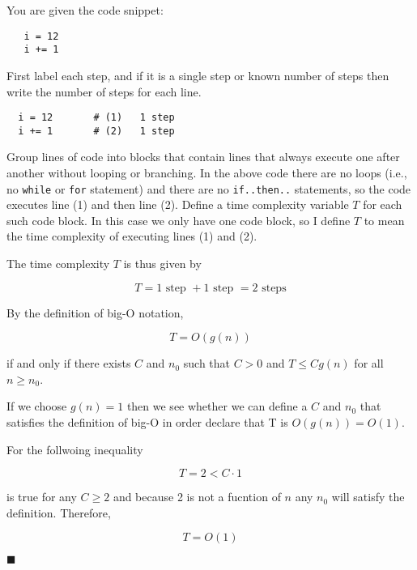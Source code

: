 \documentclass{article}
\begin{document}
You are given the code snippet:

\begin{verbatim}
   i = 12
   i += 1
\end{verbatim}

First label each step, and if it is a single step or known number
of steps then write the number of steps for each line.

\begin{verbatim}
  i = 12       # (1)   1 step
  i += 1       # (2)   1 step
\end{verbatim}

Group lines of code into blocks that contain lines that always execute
one after another without looping or branching.  In the above code
there are no loops (i.e., no \verb|while| or \verb|for| statement) and
there are no \verb|if..then..| statements, so the code executes line
(1) and then line (2).  Define a time complexity variable $T$ for each
such code block.  In this case we only have one code block, so I
define $T$ to mean the time complexity of executing lines (1) and (2).

The time complexity $T$ is thus given by

\begin{equation}
  T = 1 \text{ step } + 1 \text{ step } = 2 \text{ steps}
\end{equation}

By the definition of big-O notation,

\begin{equation}
  T = O(g(n))
\end{equation}

if and only if there exists $C$ and $n_0$ such that $C > 0$ and $T
\leq Cg(n)$ for all $n \geq n_0$.

If we choose $g(n) = 1$ then we see whether we can define a $C$ and
$n_0$ that satisfies the definition of big-O in order declare that T
is $O(g(n)) = O(1)$.

For the follwoing inequality

\begin{equation}
  T = 2 < C \cdot 1
\end{equation}

is true for any $C \geq 2$ and because 2 is not a fucntion of $n$ any
$n_0$ will satisfy the definition.  Therefore,

\begin{equation}
  \boxed{T = O(1)}
\end{equation}

$\blacksquare$
\end{document}
